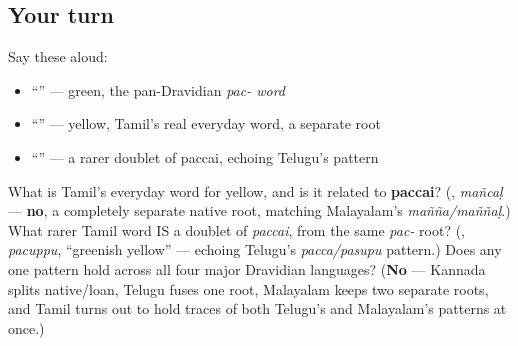 \subsection*{Your turn}
Say these aloud:

\begin{itemize}
\raggedright
  \item \textquotedblleft{}\textquotedblright{} — green, the pan-Dravidian \emph{pac- word}
  \item \textquotedblleft{}\textquotedblright{} — yellow, Tamil's real everyday word, a separate root
  \item \textquotedblleft{}\textquotedblright{} — a rarer doublet of paccai, echoing Telugu's pattern
\end{itemize}

\begin{tcolorbox}[breakable,colback=teal!4,colframe=teal!35!black,title={Before you move on}]
What is Tamil's everyday word for yellow, and is it related to \textbf{paccai}? (\textbf{}, \emph{mañcaḷ} — \textbf{no}, a completely separate native root, matching Malayalam's \emph{mañña/maññaḷ}.) What rarer Tamil word IS a doublet of \emph{paccai}, from the same \emph{pac-} root? (\textbf{}, \emph{pacuppu}, \textquotedblleft{}greenish yellow\textquotedblright{} — echoing Telugu's \emph{pacca/pasupu} pattern.) Does any one pattern hold across all four major Dravidian languages? (\textbf{No} — Kannada splits native/loan, Telugu fuses one root, Malayalam keeps two separate roots, and Tamil turns out to hold traces of both Telugu's and Malayalam's patterns at once.)
\end{tcolorbox}
